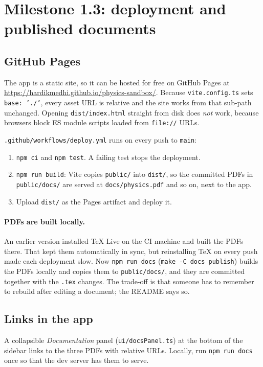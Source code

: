 \documentclass[11pt]{article}
\begin{document}
\section{Milestone 1.3: deployment and published documents}

\subsection{GitHub Pages}
The app is a static site, so it can be hosted for free on GitHub Pages at
\url{https://hardikmedhi.github.io/physics-sandbox/}. Because \texttt{vite.config.ts} sets
\texttt{base: './'}, every asset URL is relative and the site works from that sub-path unchanged.
Opening \texttt{dist/index.html} straight from disk does \emph{not} work, because browsers block ES
module scripts loaded from \texttt{file://} URLs.

\texttt{.github/workflows/deploy.yml} runs on every push to \texttt{main}:
\begin{enumerate}
  \item \texttt{npm ci} and \texttt{npm test}. A failing test stops the deployment.
  \item \texttt{npm run build}: Vite copies \texttt{public/} into \texttt{dist/}, so the committed PDFs in
        \texttt{public/docs/} are served at \texttt{docs/physics.pdf} and so on, next to the app.
  \item Upload \texttt{dist/} as the Pages artifact and deploy it.
\end{enumerate}

\paragraph{PDFs are built locally.} An earlier version installed \TeX{} Live on the CI machine and built the PDFs
there. That kept them automatically in sync, but reinstalling \TeX{} on every push made each deployment slow. Now
\texttt{npm run docs} (\texttt{make -C docs publish}) builds the PDFs locally and copies them to
\texttt{public/docs/}, and they are committed together with the \texttt{.tex} changes. The trade-off is that someone has
to remember to rebuild after editing a document; the README says so.

\subsection{Links in the app}
A collapsible \emph{Documentation} panel (\texttt{ui/docsPanel.ts}) at the bottom of the sidebar links to
the three PDFs with relative URLs. Locally, run \texttt{npm run docs} once so that the dev server has
them to serve.
\end{document}
